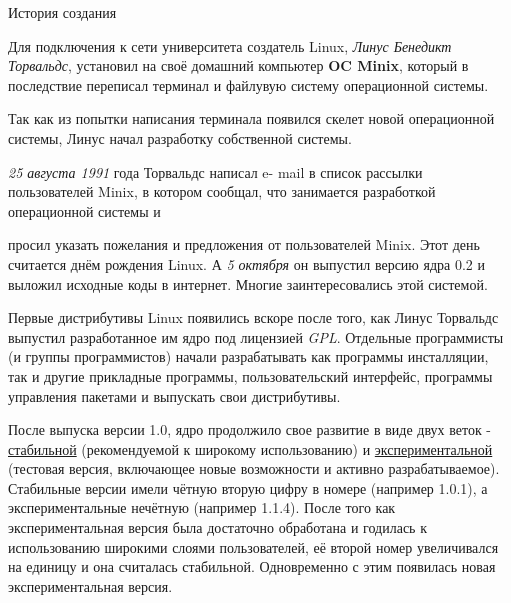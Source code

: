 \documentclass[14pt]{beamer}
\begin{document}
\begin{frame}
\begin{block}{История создания}
\par Для подключения к сети университета создатель 
Linux, \textsl{Линус Бенедикт Торвальдс}, установил 
на своё домашний компьютер \textbf{OC Minix}, 
который в последствие переписал терминал и файлувую 
систему операционной системы.
\par Так как из попытки написания терминала 
появился скелет новой операционной системы, Линус 
начал разработку собственной системы.
\end{block}
\end{frame}

\begin{frame}
\begin{block}

\textsl{25 августа 1991} года Торвальдс написал e-
mail в список рассылки пользователей Minix, в 
котором сообщал, что занимается разработкой 
операционной системы и 

просил указать пожелания и предложения от 
пользователей Minix. Этот день считается днём 
рождения 
Linux. А \textsl{5 октября} он выпустил  версию  
ядра  0.2  и  выложил  исходные  коды  в  интернет.  
Многие
заинтересовались этой системой.

\end{block}
\end{frame}

\begin{frame}
\begin{block}

Первые дистрибутивы Linux появились вскоре после 
того, как Линус Торвальдс выпустил разработанное им 
ядро под лицензией \textsl{GPL}. Отдельные 
программисты (и группы программистов) начали 
разрабатывать как программы инсталляции, так и 
другие прикладные программы, пользовательский 
интерфейс, программы управления 
пакетами и выпускать свои дистрибутивы.

\end{block}
\end{frame}

\begin{frame}[shrink=10]
\begin{block}

После выпуска версии 1.0, ядро продолжило свое 
развитие в виде двух веток - \underline{стабильной} 
(рекомендуемой к широкому использованию) и 
\underline{экспериментальной} (тестовая версия, 
включающее новые возможности и активно 
разрабатываемое). Стабильные версии имели чётную 
вторую цифру в номере (например 1.0.1), а 
экспериментальные нечётную (например 1.1.4). После 
того как экспериментальная версия была достаточно 
обработана и годилась к использованию широкими 
слоями пользователей, её второй номер увеличивался 
на единицу и она считалась стабильной. Одновременно 
с этим появилась новая экспериментальная версия.

\end{block}
\end{frame}
\end{document}
